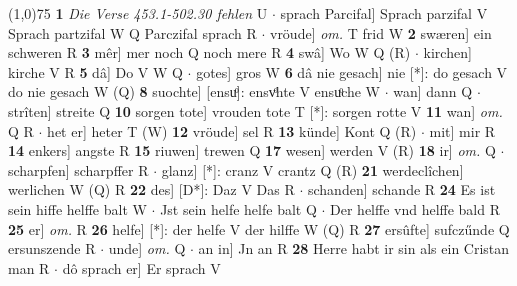 \documentclass[8pt,a4paper,notitlepage]{article}
\begin{document}
\begin{table}[ht]
\begin{minipage}[t]{0.5\linewidth}
\line(1,0){75} \newline
\textbf{1} \textit{Die Verse 453.1-502.30 fehlen} U   $\cdot$ sprach Parcifal] Sprach parzifal V Sprach partzifal W Q Parczifal sprach R  $\cdot$ vröude] \textit{om.} T frid W \textbf{2} swæren] ein schweren R \textbf{3} mêr] mer noch Q noch mere R \textbf{4} swâ] Wo W Q (R)  $\cdot$ kirchen] kirche V R \textbf{5} dâ] Do V W Q  $\cdot$ gotes] gros W \textbf{6} dâ nie gesach] nie  [*]: do gesach V do nie gesach W (Q) \textbf{8} suochte] [ensuͦ]: ensvͦhte V ensuͦche W  $\cdot$ wan] dann Q  $\cdot$ strîten] streite Q \textbf{10} sorgen tote] vrouden tote T [*]: sorgen rotte V \textbf{11} wan] \textit{om.} Q R  $\cdot$ het er] heter T (W) \textbf{12} vröude] sel R \textbf{13} künde] Kont Q (R)  $\cdot$ mit] mir R \textbf{14} enkers] angste R \textbf{15} riuwen] trewen Q \textbf{17} wesen] werden V (R) \textbf{18} ir] \textit{om.} Q  $\cdot$ scharpfen] scharpffer R  $\cdot$ glanz] [*]: cranz V crantz Q (R) \textbf{21} werdeclîchen] werlichen W (Q) R \textbf{22} des] [D*]: Daz V Das R  $\cdot$ schanden] schande R \textbf{24} Es ist sein hiffe helffe balt W  $\cdot$ Jst sein helfe helfe balt Q  $\cdot$ Der helffe vnd helffe bald R \textbf{25} er] \textit{om.} R \textbf{26} helfe] [*]: der helfe V der hilffe W (Q) R \textbf{27} ersûfte] sufczűnde Q ersunszende R  $\cdot$ unde] \textit{om.} Q  $\cdot$ an in] Jn an R \textbf{28} Herre habt ir sin als ein Cristan man R  $\cdot$ dô sprach er] Er sprach V \newline
\end{minipage}
\end{table}
\end{document}
